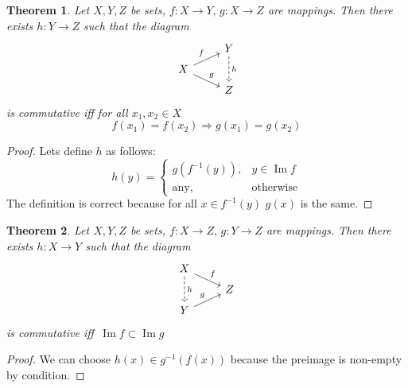 \documentclass{article}
\newtheorem{thm}{Theorem}
\DeclareMathOperator{\Image}{Im}
\begin{document}
\begin{thm}
    Let $X, Y, Z$ be sets, $f:X\to Y,\,g:X\to Z$ are mappings. Then there exists $h: Y\to Z$ 
    such that the diagram
    \[
    \begin{tikzcd}[row sep = tiny]
                                          & Y \arrow[dd, dashrightarrow, "h"] \\
         X\arrow[ru, "f"] \arrow[rd, "g"] & \\
                                          & Z 
    \end{tikzcd}
    \]   
    is commutative iff for all $x_1, x_2\in X$
    \[
        f(x_1)=f(x_2) \Rightarrow g(x_1)=g(x_2) 
    \] 
\end{thm}
\begin{proof}
    Lets define $h$ as follows:
    \[
        h(y) = 
        \begin{cases}
            g(f^{-1}(y)), & y\in \Image f\\
            \text{any}, & \text{otherwise} 
        \end{cases}
    \]
    The definition is correct because for all $x\in f^{-1}(y)$ $g(x)$ is the same.
\end{proof}

\begin{thm}
    Let $X, Y, Z$ be sets, $f:X\to Z,\,g:Y\to Z$ are mappings. 
    Then there exists $h: X\to Y$ such that the diagram
    \[
    \begin{tikzcd}[row sep = tiny]
        X\arrow[dd, dashrightarrow, "h"] \arrow[rd, "f"] &  \\
                                                         &  Z\\
        Y\arrow[ru, "g"] & 
    \end{tikzcd}
    \]   
    is commutative iff\, $\Image f \subset  \Image g$
\end{thm}
\begin{proof}
    We can choose $h(x) \in g^{-1}(f(x))$ because 
    the preimage is non-empty by condition.
\end{proof}
\end{document}
